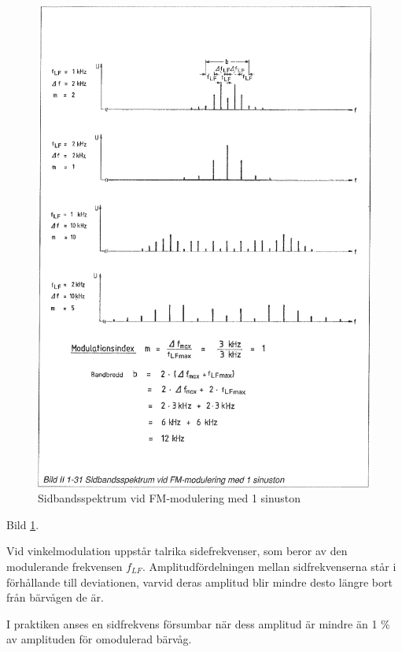 \begin{figure}[ht]
\begin{center}
\includegraphics[width=14cm]{images/bild_2_1-31}
\caption{Sidbandsspektrum vid FM-modulering med 1 sinuston}
\label{fig:BildII1-31}
\end{center}
\end{figure}

Bild \ref{fig:BildII1-31}.

Vid vinkelmodulation uppstår talrika sidefrekvenser, som beror av den
modulerande frekvensen \(f_{LF}\). Amplitudfördelningen mellan sidfrekvenserna
står i förhållande till deviationen, varvid deras amplitud blir mindre desto
längre bort från bärvågen de är.

I praktiken anses en sidfrekvens försumbar när dess amplitud är mindre än 1 \%
av amplituden för omodulerad bärvåg.

